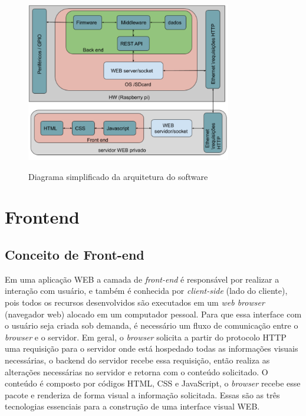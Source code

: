 \documentclass[../../layout.tex]{subfiles}
\begin{document}
\begin{figure}[H]
\centering
\caption{Diagrama simplificado da arquitetura do software}
\includegraphics[width=0.8\textwidth]{assets/static/img/diagrama_tcc.jpg}
\label{fig:diagrama_sw}
\end{figure}

\section{Frontend}

\subsection{Conceito de Front-end}
\hspace*{3em}Em uma aplicação WEB a camada de \emph{front-end} é responsável por realizar a interação com usuário, e  também é conhecida por \emph{client-side} (lado do cliente), pois todos os recursos desenvolvidos são executados em um \emph{web browser} (navegador web) alocado em um computador pessoal. Para que essa interface com o usuário seja criada sob demanda, é necessário um fluxo de comunicação entre o \emph{browser} e o servidor. Em geral, o \emph{browser} solicita a partir do protocolo HTTP uma requisição para o servidor onde está hospedado todas as informações visuais necessárias, o backend do servidor recebe essa requisição, então realiza as alterações necessárias no servidor e retorna com o conteúdo solicitado. O conteúdo é composto por códigos HTML, CSS e JavaScript, o \emph{browser} recebe esse pacote e renderiza de forma visual a informação solicitada. Essas são as três tecnologias essenciais para a construção de uma interface visual WEB.\cite{frontend}
\end{document}
